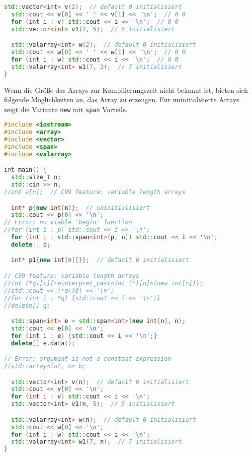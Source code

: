 \documentclass[10pt,twocolumn]{scrartcl}
\begin{document}
\begin{lstlisting}[language=C++]
  std::vector<int> v(2);  // default 0 initialisiert
  std::cout << v[0] << ' ' << v[1] << '\n';  // 0 0
  for (int i : v) std::cout << i << '\n';  // 0 0
  std::vector<int> v1(2, 5);  // 5 initialisiert

  std::valarray<int> w(2);  // default 0 initialisiert
  std::cout << w[0] << ' ' << w[1] << '\n';  // 0 0
  for (int i : w) std::cout << i << '\n';  // 0 0
  std::valarray<int> w1(7, 2);  // 7 initialisiert
}
\end{lstlisting}

Wenn die Größe das Arrays zur Kompilierungszeit nicht bekannt ist, bieten sich
folgende Möglichkeiten an, das Array zu erzeugen. Für uninitialisierte Arrays
zeigt die Variante \lstinline|new| mit \lstinline|span| Vorteile.

\begin{lstlisting}[language=C++]
#include <iostream>
#include <array>
#include <vector>
#include <span>
#include <valarray>

int main() {
  std::size_t n;
  std::cin >> n;
//int a[n];  // C99 feature: variable length arrays

  int* p{new int[n]};  // uninitialisiert
  std::cout << p[0] << '\n';
// Error: no viable 'begin' function
//for (int i : p) std::cout << i << '\n';
  for (int i : std::span<int>(p, n)) std::cout << i << '\n';
  delete[] p;

  int* p1{new int[n]{}};  // default 0 initialisiert

// C99 feature: variable length arrays
//int (*q)[n]{reinterpret_cast<int (*)[n]>(new int[n])};
//std::cout << (*q)[0] << '\n';
//for (int i : *q) {std::cout << i << '\n';}
//delete[] q;

  std::span<int> e = std::span<int>(new int[n], n);
  std::cout << e[0] << '\n';
  for (int i : e) {std::cout << i << '\n';}
  delete[] e.data();

// Error: argument is not a constant expression
//std::array<int, n> b;

  std::vector<int> v(n);  // default 0 initialisiert
  std::cout << v[0] << '\n';
  for (int i : v) std::cout << i << '\n';
  std::vector<int> v1(n, 5);  // 5 initialisiert

  std::valarray<int> w(n);  // default 0 initialisiert
  std::cout << w[0] << '\n';
  for (int i : w) std::cout << i << '\n';
  std::valarray<int> w1(7, n);  // 7 initialisiert
}
\end{lstlisting}


\end{document}
